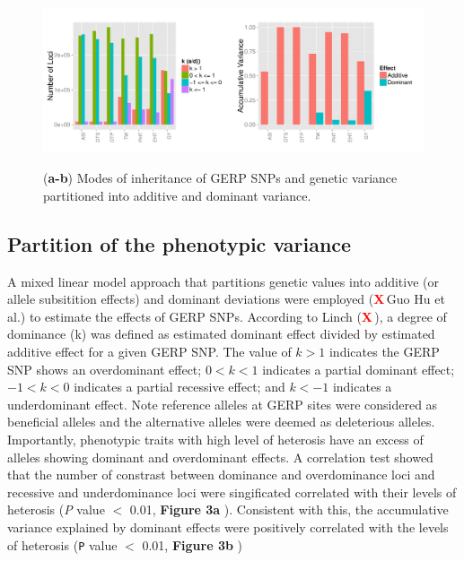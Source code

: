\documentclass[twoside,twocolumn, letterpaper]{article}
\renewcommand{\baselinestretch}{1}
\newcommand{\X}{\textcolor{red}{\bf X\,}}
\begin{document}
\begin{figure}[tbh]   
  \begin{center}
   \vspace{-2mm}
   \includegraphics[width=0.8\linewidth]{Fig3_eff_var.pdf}
   \renewcommand{\baselinestretch}{0.9}
   \vspace{-3mm}
   \caption{({\bfseries a-b}) Modes of inheritance of GERP SNPs and genetic variance partitioned into additive and dominant variance. } 
\vspace{-4mm}
    \label{fig:effvar}
  \end{center}
\end{figure}

\subsection*{Partition of the phenotypic variance}

A mixed linear model approach that partitions genetic values into additive (or allele subsitition effects) and dominant deviations were employed (\X Guo Hu et al.) to estimate the effects of GERP SNPs. According to Linch (\X), a degree of dominance (k) was defined as estimated dominant effect divided by estimated additive effect for a given GERP SNP. The value of $k > 1$ indicates the GERP SNP shows an overdominant effect; $0 < k < 1$ indicates a partial dominant effect; $-1 < k < 0$ indicates a partial recessive effect; and $k < -1$ indicates a underdominant effect. Note reference alleles at GERP sites were considered as beneficial alleles and the alternative alleles were deemed as deleterious alleles. Importantly, phenotypic traits with high level of heterosis have an excess of alleles showing dominant and overdominant effects. A correlation test showed that the number of constrast between dominance and overdominance loci and recessive and underdominance loci were singificated correlated with their levels of heterosis (\emph{P} value $<$ 0.01, \textbf{Figure 3a} ). Consistent with this, the accumulative variance explained by dominant effects were positively correlated with the levels of heterosis (\texttt{P} value $<$ 0.01,  \textbf{Figure 3b} )
\end{document}
